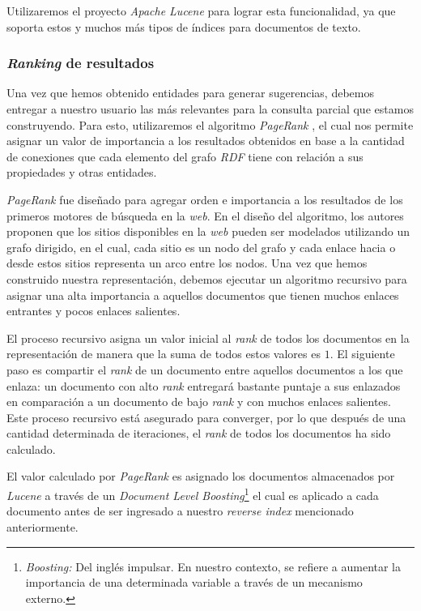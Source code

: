 Utilizaremos el proyecto \textit{Apache Lucene} \cite{apache2012welcome} para
lograr esta funcionalidad, ya que soporta estos y muchos más tipos de
índices para documentos de texto.

\subsubsection{\textit{Ranking} de resultados}

Una vez que hemos obtenido entidades para generar sugerencias, debemos entregar
a nuestro usuario las más relevantes para la consulta parcial que estamos
construyendo. Para esto, utilizaremos el algoritmo \textit{PageRank}
\cite{page1999pagerank}, el cual nos permite asignar un valor de importancia a
los resultados obtenidos en base a la cantidad de conexiones que cada elemento del grafo
\textit{RDF} tiene con relación a sus propiedades y otras entidades.

\textit{PageRank} fue diseñado para agregar orden e importancia a los resultados
de los primeros motores de búsqueda en la \textit{web}. En el diseño del
algoritmo, los autores proponen que los sitios disponibles en la \textit{web}
pueden ser modelados utilizando un grafo dirigido, en el cual, cada sitio
es un nodo del grafo y cada enlace hacia o desde estos sitios representa un arco
entre los nodos. Una vez que hemos construido nuestra representación, debemos
ejecutar un algoritmo recursivo para asignar una alta importancia a
aquellos documentos que tienen muchos enlaces entrantes y pocos enlaces
salientes.

El proceso recursivo asigna un valor inicial al \textit{rank} de todos los
documentos en la representación de manera que la suma de todos estos valores
es $1$. El siguiente paso es compartir el \textit{rank} de un documento entre
aquellos documentos a los que enlaza: un documento con alto \textit{rank}
entregará bastante puntaje a sus enlazados en comparación a un documento de bajo
\textit{rank} y con muchos enlaces salientes. Este proceso recursivo está
asegurado para converger, por lo que después de una cantidad determinada de
iteraciones, el \textit{rank} de todos los documentos ha sido calculado.

El valor calculado por \textit{PageRank} es asignado los documentos almacenados
por \textit{Lucene} a través de un \textit{Document Level
Boosting}\footnote{\textit{Boosting:} Del inglés impulsar. En nuestro contexto,
se refiere a aumentar la importancia de una determinada variable a través de un
mecanismo externo.} el cual es aplicado a cada documento antes de ser ingresado
a nuestro \textit{reverse index} mencionado anteriormente.

% 
% 
% 

